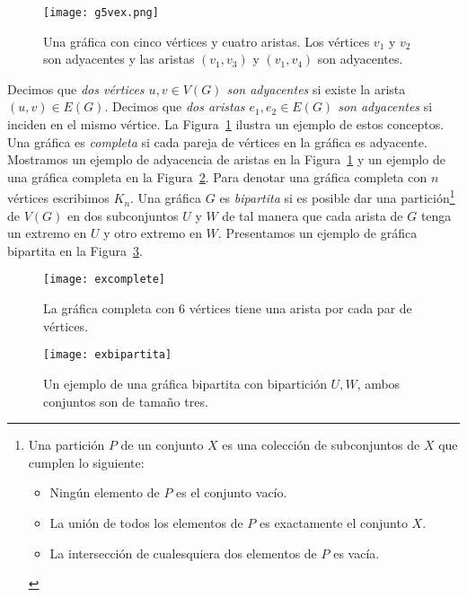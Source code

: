 \begin{figure}[t]
  \centering
  \texttt{[image: g5vex.png]}
  \caption{Una gráfica con cinco vértices y cuatro aristas. Los vértices $v_1$ y $v_2$
  son adyacentes y las aristas $(v_1,v_3)$ y $(v_1,v_4)$ son adyacentes.}
  \label{fig:g5vex}
\end{figure}
Decimos que \emph{dos vértices $u,v\in V(G)$ son adyacentes} si existe la arista
$(u,v)\in E(G)$. Decimos que \emph{dos aristas $e_1,e_2 \in E(G)$ son adyacentes}
si inciden en el mismo vértice. La Figura~\ref{fig:g5vex} ilustra
un ejemplo de estos conceptos.
Una gráfica es \emph{completa} si cada pareja de vértices
en la gráfica es adyacente. Mostramos un ejemplo de adyacencia de
aristas en la Figura~\ref{fig:g5vex} y un ejemplo de una gráfica completa en la Figura~\ref{fig:excomplete}.
Para denotar una gráfica completa con $n$
vértices escribimos $K_n$. Una gráfica $G$ es \emph{bipartita} si es posible
dar una partición\footnote{Una partición $P$ de un conjunto $X$ es
una colección de subconjuntos de $X$ que cumplen lo siguiente:
\begin{itemize}
\item Ningún elemento de $P$ es el conjunto vacío.
\item La unión de todos los elementos de $P$ es exactamente el conjunto $X$.
\item La intersección de cualesquiera dos elementos de $P$ es vacía.
\end{itemize} }
de $V(G)$ en dos subconjuntos $U$ y $W$ de tal manera que cada
arista de $G$ tenga un extremo en $U$ y otro extremo en $W$. Presentamos
un ejemplo de gráfica bipartita en la Figura~\ref{fig:exbipar}.
\begin{figure}[htb]
  \centering
  \texttt{[image: excomplete]}
  \caption{La gráfica completa con 6 vértices tiene una arista por cada par de vértices.}
  \label{fig:excomplete}
\end{figure}
\begin{figure}[h]
  \centering
  \texttt{[image: exbipartita]}
  \caption{Un ejemplo de una gráfica bipartita con bipartición $U, W$, ambos conjuntos son de tamaño tres.}
  \label{fig:exbipar}
\end{figure}

